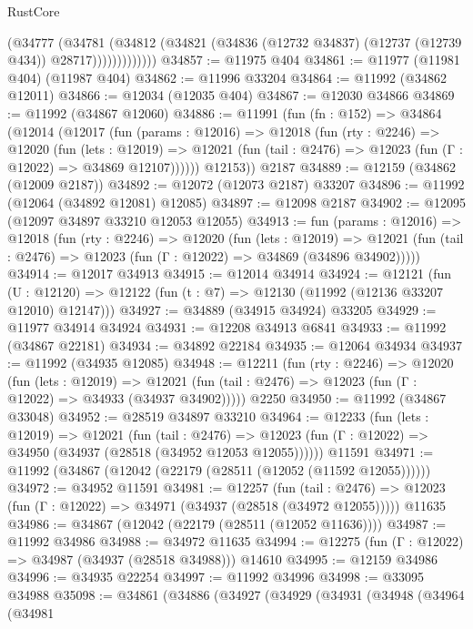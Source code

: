 \begin{lexlean}{RustCore}
\begin{coremodule}
                    (@34777
                      (@34781
                        (@34812
                          (@34821 (@34836 (@12732 @34837) (@12737 (@12739 @434)) @28717)))))))))))))
@34857 := @11975 @404
@34861 := @11977 (@11981 @404) (@11987 @404)
@34862 := @11996 @33204
@34864 := @11992 (@34862 @12011)
@34866 := @12034 (@12035 @404)
@34867 := @12030 @34866
@34869 := @11992 (@34867 @12060)
@34886 := @11991
    (fun (fn : @152) =>
    @34864
      (@12014
        (@12017
          (fun (params : @12016) =>
          @12018
            (fun (rty : @2246) =>
            @12020
              (fun (lets : @12019) =>
              @12021 (fun (tail : @2476) => @12023 (fun (Γ : @12022) => @34869 @12107))))))
        @12153))
    @2187
@34889 := @12159 (@34862 (@12009 @2187))
@34892 := @12072 (@12073 @2187) @33207
@34896 := @11992 (@12064 (@34892 @12081) @12085)
@34897 := @12098 @2187
@34902 := @12095 (@12097 @34897 @33210 @12053 @12055)
@34913 := fun (params : @12016) =>
  @12018
    (fun (rty : @2246) =>
    @12020
      (fun (lets : @12019) =>
      @12021 (fun (tail : @2476) => @12023 (fun (Γ : @12022) => @34869 (@34896 @34902)))))
@34914 := @12017 @34913
@34915 := @12014 @34914
@34924 := @12121
    (fun (U : @12120) => @12122 (fun (t : @7) => @12130 (@11992 (@12136 @33207 @12010) @12147)))
@34927 := @34889 (@34915 @34924) @33205
@34929 := @11977 @34914 @34924
@34931 := @12208 @34913 @6841
@34933 := @11992 (@34867 @22181)
@34934 := @34892 @22184
@34935 := @12064 @34934
@34937 := @11992 (@34935 @12085)
@34948 := @12211
    (fun (rty : @2246) =>
    @12020
      (fun (lets : @12019) =>
      @12021 (fun (tail : @2476) => @12023 (fun (Γ : @12022) => @34933 (@34937 @34902)))))
    @2250
@34950 := @11992 (@34867 @33048)
@34952 := @28519 @34897 @33210
@34964 := @12233
    (fun (lets : @12019) =>
    @12021
      (fun (tail : @2476) =>
      @12023 (fun (Γ : @12022) => @34950 (@34937 (@28518 (@34952 @12053 @12055))))))
    @11591
@34971 := @11992 (@34867 (@12042 (@22179 (@28511 (@12052 (@11592 @12055))))))
@34972 := @34952 @11591
@34981 := @12257
    (fun (tail : @2476) => @12023 (fun (Γ : @12022) => @34971 (@34937 (@28518 (@34972 @12055)))))
    @11635
@34986 := @34867 (@12042 (@22179 (@28511 (@12052 @11636))))
@34987 := @11992 @34986
@34988 := @34972 @11635
@34994 := @12275 (fun (Γ : @12022) => @34987 (@34937 (@28518 @34988))) @14610
@34995 := @12159 @34986
@34996 := @34935 @22254
@34997 := @11992 @34996
@34998 := @33095 @34988
@35098 := @34861
    (@34886
      (@34927
        (@34929
          (@34931
            (@34948
              (@34964
                (@34981

\end{coremodule}
\end{lexlean}

